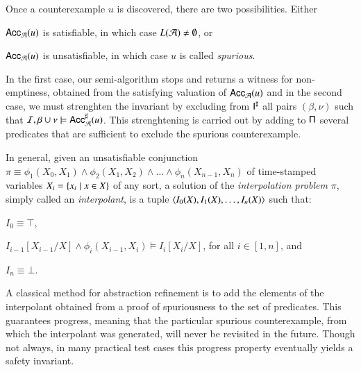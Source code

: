 \documentclass[10pt,conference,letterpaper,twocolumn]{IEEEtran}
\begin{document}
Once a counterexample $u$ is discovered, there are two
possibilities. Either\begin{inparaenum}[(i)]
\item $\mathsf{Acc}_{\mathcal{A}}(u)$ is satisfiable, in which case $L(\mathcal{A}) \neq \emptyset$, or
\item $\mathsf{Acc}_{\mathcal{A}}(u)$ is unsatisfiable, in which case $u$ is called
  \emph{spurious}.
\end{inparaenum}
In the first case, our semi-algorithm stops and returns a witness for
non-emptiness, obtained from the satisfying valuation of
$\mathsf{Acc}_{\mathcal{A}}(u)$ and in the second case, we must strenghten the
invariant by excluding from ${\mathsf{I}}^\sharp$ all pairs $(\beta,\nu)$ such
that $\mathcal{I},\beta\cup\nu \models {\mathsf{Acc}}^\sharp_{\mathcal{A}}(u)$. This strenghtening
is carried out by adding to $\mathsf{\Pi}$ several predicates that are
sufficient to exclude the spurious counterexample.

In general, given an unsatisfiable conjunction $\pi \equiv
\phi_1(X_0,X_1) \wedge \phi_2(X_1,X_2) \wedge \ldots \wedge
\phi_n(X_{n-1},X_n)$ of time-stamped variables $X_i = \left\{ x_i \mid x
  \in X \right\}$ of any sort, a solution of the \emph{interpolation problem}
$\pi$, simply called an \emph{interpolant}, is a tuple $\left\langle I_0(X),
  I_1(X), \ldots, I_n(X) \right\rangle$ such that:\begin{inparaenum}[(i)]
\item $I_0 \equiv \top$,  
%
\item $I_{i-1}[X_{i-1}/X] \wedge \phi_i(X_{i-1},X_i) \models
  I_i[X_i/X]$, for all $i \in [1,n]$, and
%
\item $I_n \equiv \bot$. 
\end{inparaenum}
A classical method for abstraction refinement is to add the elements
of the interpolant obtained from a proof of spuriousness to the set of
predicates. This guarantees progress, meaning that the particular
spurious counterexample, from which the interpolant was generated,
will never be revisited in the future. Though not always, in many
practical test cases this progress property eventually yields a safety
invariant.
\end{document}
